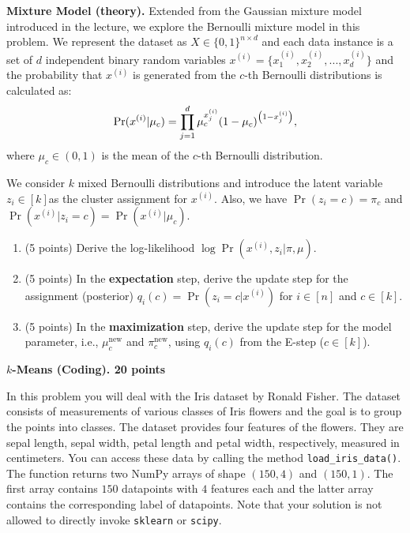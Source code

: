 \documentclass{article}
\begin{document}
\begin{enumerate}
\begin{Q}
\begin{enumerate}
  \end{enumerate}
    \end{Q}

  
  \begin{Q}
\textbf{Mixture Model (theory).}
Extended from the Gaussian mixture model introduced in the lecture, we explore the Bernoulli mixture model in this problem. We represent the dataset as $X \in \{0,1\}^{n\times d}$ and each data instance is a set of $d$ independent binary random variables $x^{(i)} = \{x^{(i)}_1, x^{(i)}_2, ..., x^{(i)}_d\}$ and the probability that $x^{(i)}$ is generated from the $c$-th Bernoulli distributions is calculated as:
\begin{align}
    \Pr(x^{(i)}|\mu_c) = \prod_{j=1}^d \mu_c^{x^{(i)}_j}(1-\mu_c)^{\left(1-x^{(i)}_j\right)} ,\notag
\end{align}
where $\mu_c \in (0,1)$ is the mean of the $c$-th Bernoulli distribution.

We consider $k$ mixed Bernoulli distributions and introduce the
latent variable $z_{i} \in [k]$as the cluster assignment for
$x^{(i)}$.
Also, we have $\Pr(z_{i} = c) = \pi_c$ and $\Pr(x^{(i)}|z_{i} = c) = \Pr(x^{(i)}|\mu_c)$.

\begin{enumerate}
    \item (5 points) Derive the log-likelihood $\log \Pr(x^{(i)}, z_i| \pi,
      \mu)$.


    \item (5 points) In the \textbf{expectation} step, derive the update step for
      the assignment (posterior) $q_{i}(c)=\Pr(z_{i} = c|x^{(i)})$ for
      $i \in [n]$ and $c \in   [k]$.

      
    \item (5 points) In the \textbf{maximization} step, derive the update step
      for the model parameter, i.e., $\mu_c^{\text{new}}$ and
      $\pi_c^{\text{new}}$,  using $q_i(c)$ from the E-step ($c \in [k]$).

      
\end{enumerate}
\end{Q}


\begin{Q}
  \textbf{$k$-Means (Coding). 20 points} \label{kmc}

  In this problem you will deal with the Iris dataset by Ronald Fisher. The dataset consists of measurements of various classes of Iris flowers and the goal is to group the points into classes. The dataset provides four features of the flowers. They are sepal length, sepal width, petal length and petal width, respectively, measured in centimeters. You can access these data by calling the method \texttt{load\_iris\_data()}. The function returns two NumPy arrays of shape $(150,4)$ and $(150,1)$. The first array contains $150$ datapoints with $4$ features each and the latter array contains the corresponding label of datapoints. Note that your solution is not allowed to directly invoke \texttt{sklearn} or \texttt{scipy}.
  

\end{Q}
\end{enumerate}
\end{document}
